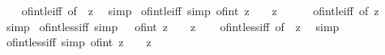\begin{isabellebody}
%
\isadelimproof
\ \ %
\endisadelimproof
%
\isatagproof
{}\isamarkupfalse%
\ of{\isacharunderscore}{\kern0pt}int{\isacharunderscore}{\kern0pt}le{\isacharunderscore}{\kern0pt}iff\ {\isacharbrackleft}{\kern0pt}of\ {}\ z{\isacharbrackright}{\kern0pt}\ \isamarkupfalse%
\ simp%
\endisatagproof
{\isafoldproof}%
%
\isadelimproof
\isanewline
%
\endisadelimproof
\isanewline
{}\isamarkupfalse%
\ of{\isacharunderscore}{\kern0pt}int{\isacharunderscore}{\kern0pt}le{\isacharunderscore}{\kern0pt}{}{\isacharunderscore}{\kern0pt}iff\ {\isacharbrackleft}{\kern0pt}simp{\isacharbrackright}{\kern0pt}{\isacharcolon}{\kern0pt}\ {\isachardoublequoteopen}of{\isacharunderscore}{\kern0pt}int\ z\ {\isasymle}\ {}\ {\isasymlongleftrightarrow}\ z\ {\isasymle}\ {}{\isachardoublequoteclose}\isanewline
%
\isadelimproof
\ \ %
\endisadelimproof
%
\isatagproof
{}\isamarkupfalse%
\ of{\isacharunderscore}{\kern0pt}int{\isacharunderscore}{\kern0pt}le{\isacharunderscore}{\kern0pt}iff\ {\isacharbrackleft}{\kern0pt}of\ z\ {}{\isacharbrackright}{\kern0pt}\ \isamarkupfalse%
\ simp%
\endisatagproof
{\isafoldproof}%
%
\isadelimproof
\isanewline
%
\endisadelimproof
\isanewline
{}\isamarkupfalse%
\ of{\isacharunderscore}{\kern0pt}int{\isacharunderscore}{\kern0pt}{}{\isacharunderscore}{\kern0pt}less{\isacharunderscore}{\kern0pt}iff\ {\isacharbrackleft}{\kern0pt}simp{\isacharbrackright}{\kern0pt}{\isacharcolon}{\kern0pt}\ {\isachardoublequoteopen}{}\ {\isacharless}{\kern0pt}\ of{\isacharunderscore}{\kern0pt}int\ z\ {\isasymlongleftrightarrow}\ {}\ {\isacharless}{\kern0pt}\ z{\isachardoublequoteclose}\isanewline
%
\isadelimproof
\ \ %
\endisadelimproof
%
\isatagproof
{}\isamarkupfalse%
\ of{\isacharunderscore}{\kern0pt}int{\isacharunderscore}{\kern0pt}less{\isacharunderscore}{\kern0pt}iff\ {\isacharbrackleft}{\kern0pt}of\ {}\ z{\isacharbrackright}{\kern0pt}\ \isamarkupfalse%
\ simp%
\endisatagproof
{\isafoldproof}%
%
\isadelimproof
\isanewline
%
\endisadelimproof
\isanewline
{}\isamarkupfalse%
\ of{\isacharunderscore}{\kern0pt}int{\isacharunderscore}{\kern0pt}less{\isacharunderscore}{\kern0pt}{}{\isacharunderscore}{\kern0pt}iff\ {\isacharbrackleft}{\kern0pt}simp{\isacharbrackright}{\kern0pt}{\isacharcolon}{\kern0pt}\ {\isachardoublequoteopen}of{\isacharunderscore}{\kern0pt}int\ z\ {\isacharless}{\kern0pt}\ {}\ {\isasymlongleftrightarrow}\ z\ {\isacharless}{\kern0pt}\ {}{\isachardoublequoteclose}\isanewline

\end{isabellebody}
